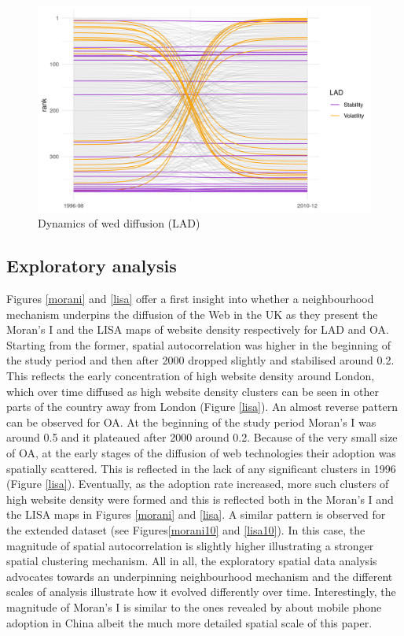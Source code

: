 \documentclass[
  authoryear,
  preprint,
  3p]{elsarticle}
\begin{document}
\begin{figure}[H]

{\centering \includegraphics[width=1\textwidth,height=\textheight]{../../outputs/ranks/web_per_firm2000_2012_only0595_av.png}

}

\caption{\label{rank}Dynamics of wed diffusion (LAD)}

\end{figure}%

\subsection{Exploratory analysis}\label{exploratory-analysis}

Figures \ref{morani} and \ref{lisa} offer a first insight into whether a
neighbourhood mechanism underpins the diffusion of the Web in the UK as
they present the Moran's I and the LISA maps of website density
respectively for LAD and OA. Starting from the former, spatial
autocorrelation was higher in the beginning of the study period and then
after 2000 dropped slightly and stabilised around 0.2. This reflects the
early concentration of high website density around London, which over
time diffused as high website density clusters can be seen in other
parts of the country away from London (Figure \ref{lisa}). An almost
reverse pattern can be observed for OA. At the beginning of the study
period Moran's I was around 0.5 and it plateaued after 2000 around 0.2.
Because of the very small size of OA, at the early stages of the
diffusion of web technologies their adoption was spatially scattered.
This is reflected in the lack of any significant clusters in 1996
(Figure \ref{lisa}). Eventually, as the adoption rate increased, more
such clusters of high website density were formed and this is reflected
both in the Moran's I and the LISA maps in Figures \ref{morani} and
\ref{lisa}. A similar pattern is observed for the extended dataset (see
Figures\ref{morani10} and \ref{lisa10}). In this case, the magnitude of
spatial autocorrelation is slightly higher illustrating a stronger
spatial clustering mechanism. All in all, the exploratory spatial data
analysis advocates towards an underpinning neighbourhood mechanism and
the different scales of analysis illustrate how it evolved differently
over time. Interestingly, the magnitude of Moran's I is similar to the
ones revealed by \citet{ding2010modeling} about mobile phone adoption in
China albeit the much more detailed spatial scale of this paper.
\end{document}
